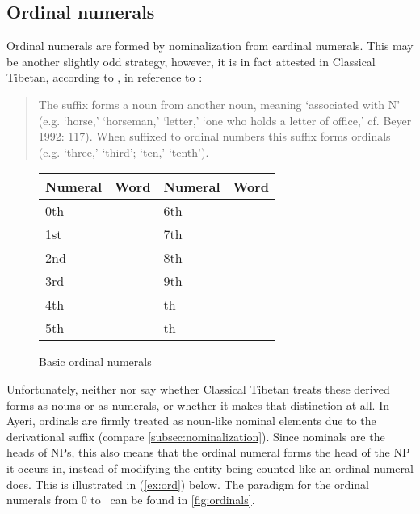 
\subsection{Ordinal numerals}

Ordinal numerals are formed by nominalization from cardinal numerals. This may 
be another slightly odd strategy, however, it is in fact attested in Classical 
Tibetan, according to \citet{chungetal2014}, in reference to \citet{beyer1992}:

\blockcquote[626]{chungetal2014}{The suffix  forms a noun from another 
noun, meaning `associated with N' (e.g.  `horse,'  
`horseman,'  `letter,'  `one who holds a letter of 
office,' cf. \nocite{beyer1992} Beyer 1992: 117). When suffixed to ordinal 
numbers this suffix forms ordinals (e.g.  `three,'  
`third';  `ten,'  `tenth').}

\begin{figure}[tp]\centering
\caption{Basic ordinal numerals}
\begin{tabu} to .75\linewidth {X[c] X[c] X[c] X[c]}
\toprule\tableheaderfont
Numeral
	& Word
	& Numeral
	& Word
	\\
\toprule

0th
	& 
	& 6th
	& 
	\\

1st
	& 
	& 7th
	& 
	\\
	
2nd
	& 
	& 8th
	& 
	\\
	
3rd
	& 
	& 9th
	& 
	\\

4th
	& 
	& \ten{}th
	& 
	\\

5th
	& 
	& \elv{}th
	& 
	\\

\bottomrule
\end{tabu}
\label{fig:ordinals}
\end{figure}

Unfortunately, neither \citet{chungetal2014} nor \citet{beyer1992} say whether
Classical Tibetan treats these derived forms as nouns or as numerals, or
whether it makes that distinction at all. In Ayeri, ordinals are firmly treated
as noun-like nominal elements due to the derivational suffix
 (compare \autoref{subsec:nominalization}). Since nominals are
the heads of NPs, this also means that the ordinal numeral forms the head of
the NP it occurs in, instead of modifying the entity being counted like an
ordinal numeral does. This is illustrated in (\ref{ex:ord}) below. The paradigm
for the ordinal numerals from 0 to \elv\ can be found in
\autoref{fig:ordinals}.

